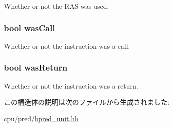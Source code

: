 \label{structBPredUnit_1_1PredictorHistory_a7238cdd6213db4fe8d76843a479b6690}
Whether or not the RAS was used. \hypertarget{structBPredUnit_1_1PredictorHistory_acd950229e5cd2e16830cbe2178f29d36}{
\subsubsection[{wasCall}]{\setlength{\rightskip}{0pt plus 5cm}bool {\bf wasCall}}}
\label{structBPredUnit_1_1PredictorHistory_acd950229e5cd2e16830cbe2178f29d36}
Whether or not the instruction was a call. \hypertarget{structBPredUnit_1_1PredictorHistory_a8b97fcb129848133145dfcadafbb05dd}{
\subsubsection[{wasReturn}]{\setlength{\rightskip}{0pt plus 5cm}bool {\bf wasReturn}}}
\label{structBPredUnit_1_1PredictorHistory_a8b97fcb129848133145dfcadafbb05dd}
Whether or not the instruction was a return. 

この構造体の説明は次のファイルから生成されました:\begin{DoxyCompactItemize}
\item 
cpu/pred/\hyperlink{bpred__unit_8hh}{bpred\_\-unit.hh}\end{DoxyCompactItemize}
